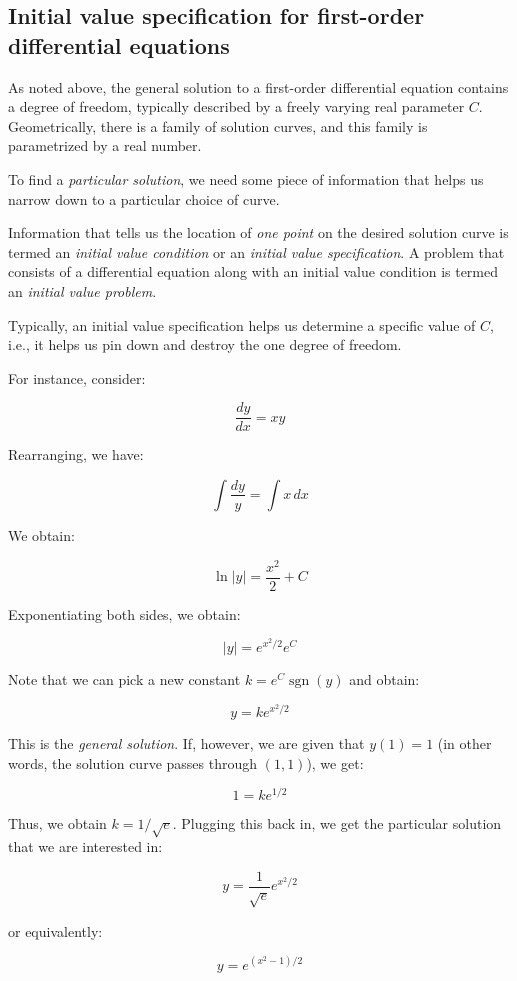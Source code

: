 \documentclass{amsart}
\begin{document}
\subsection{Initial value specification for first-order differential equations}

As noted above, the general solution to a first-order differential
equation contains a degree of freedom, typically described by a freely
varying real parameter $C$. Geometrically, there is a family of
solution curves, and this family is parametrized by a real number.

To find a {\em particular solution}, we need some piece of information
that helps us narrow down to a particular choice of curve. 

Information that tells us the location of {\em one point} on the
desired solution curve is termed an {\em initial value condition} or
an {\em initial value specification}. A problem that consists of a
differential equation along with an initial value condition is termed
an {\em initial value problem}.

Typically, an initial value specification helps us determine a
specific value of $C$, i.e., it helps us pin down and destroy the one
degree of freedom.

For instance, consider:

$$\frac{dy}{dx} = xy$$

Rearranging, we have:

$$\int \frac{dy}{y} = \int x \, dx$$

We obtain:

$$\ln|y| = \frac{x^2}{2} + C$$

Exponentiating both sides, we obtain:

$$|y| = e^{x^2/2}e^C$$

Note that we can pick a new constant $k = e^C \operatorname{sgn}(y)$
and obtain:

$$y = ke^{x^2/2}$$

This is the {\em general solution}. If, however, we are given that
$y(1) = 1$ (in other words, the solution curve passes through
$(1,1)$), we get:

$$1 = ke^{1/2}$$

Thus, we obtain $k = 1/\sqrt{e}$. Plugging this back in, we get the
particular solution that we are interested in:

$$y = \frac{1}{\sqrt{e}}e^{x^2/2}$$

or equivalently:

$$y = e^{(x^2 - 1)/2}$$
\end{document}
